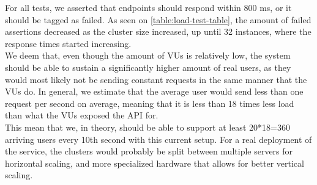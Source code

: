 For all tests, we asserted that endpoints should respond within 800 ms, or it should be tagged as failed.
As seen on \autoref{table:load-test-table}, the amount of failed assertions decreased as the cluster size increased, up until 32 instances, where the response times started increasing.
\\
We deem that, even though the amount of VUs is relatively low, the system should be able to sustain a significantly higher amount of real users, as they would most likely not be sending constant requests in the same manner that the VUs do.
In general, we estimate that the average user would send less than one request per second on average, meaning that it is less than 18 times less load than what the VUs exposed the API for.
\\
This mean that we, in theory, should be able to support at least 20*18=360 arriving users every 10th second with this current setup.
For a real deployment of the service, the clusters would probably be split between multiple servers for horizontal scaling, and more specialized hardware that allows for better vertical scaling.